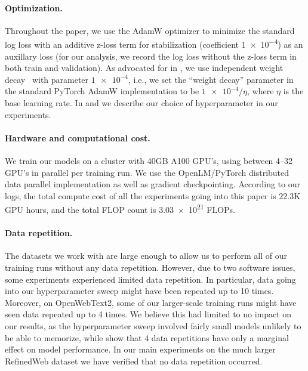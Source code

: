 \documentclass{article}
\theoremstyle{plain}
\theoremstyle{definition}
\theoremstyle{remark}
\begin{document}
\paragraph{Optimization.} Throughout the paper, we use the AdamW optimizer \cite{loshchilov2017decoupled} to minimize the standard log loss with an additive z-loss term for stabilization \cite{chowdhery2023palm} (coefficient \num{1e-4}) as an auxillary loss (for our analysis, we record the log loss without the z-loss term in both train and validation). As advocated for in \citet{wortsman2024smallscale}, we use independent weight decay~\cite{loshchilov2017decoupled} with parameter $\num{1e-4}$, i.e., we set the ``weight decay'' parameter in the standard PyTorch AdamW implementation to be $\num{1e-4} /\eta$, where $\eta$ is the base learning rate. In  and  we describe our choice of hyperparameter in our experiments.

\paragraph{Hardware and computational cost.} We train our models on a cluster with 40GB A100 GPU's, using between 4--32 GPU's in parallel per training run. We use the OpenLM/PyTorch distributed data parallel implementation as well as gradient checkpointing. According to our logs, the total compute cost of all the experiments going into this paper is  22.3K GPU hours, and the total FLOP count is \num{3.03e+21} FLOPs.

\paragraph{Data repetition.} The datasets we work with are large enough to allow us to perform all of our training runs without any data repetition. However, due to two software issues, some experiments experienced limited data repetition. In particular, data going into our hyperparameter sweep might have been repeated up to 10 times. Moreover, on OpenWebText2, some of our larger-scale training runs might have seen data repeated up to 4 times. We believe this had limited to no impact on our results, as the hyperparameter sweep involved fairly small models unlikely to be able to memorize, while \cite{muennighoff2024scaling} show that 4 data repetitions have only a marginal effect on model performance. In our main experiments on the much larger  RefinedWeb dataset we have verified that no data repetition occurred. 
\end{document}
